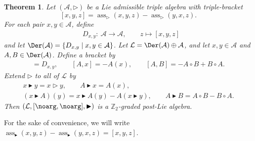 \documentclass[pdftex]{sigma}
\numberwithin{equation}{section}
\newtheorem{Theorem}{Theorem}[section]
\begin{document}
\begin{Theorem}\label{th:pL_emb}
Let $(\mathcal{A},\rhd)$ be a Lie admissible triple algebra with triple-bracket
\[
[x,y,z] = \operatorname{ass}_{\rhd}(x,y,z) -\operatorname{ass}_{\rhd}(y,x,z).
\]
For each pair $x,y \in \mathcal{A}$, define
\begin{align*}
& D_{x,y}\colon \ \mathcal{A} \longrightarrow \mathcal{A}, \qquad
 z \longmapsto [x,y,z]
\end{align*}
and let $\Der(\mathcal{A}) = \{ D_{x,y} \mid x,y \in \mathcal{A} \}$. Let $\mathcal{L}=\Der(\mathcal{A}) \oplus \mathcal{A}$, and let $x,y \in \mathcal{A}$ and $A,B \in \Der(\mathcal{A})$. Define a bracket by
\begin{gather*}
 [x,y] = D_{x,y}, \qquad
 [A,x] = -A(x), \qquad
 [A,B] = -A \circ B + B \circ A.
\end{gather*}
Extend $\rhd$ to all of $\mathcal{L}$ by
\begin{gather*}
 x \blacktriangleright y = x \rhd y, \qquad
 A \blacktriangleright x = A(x), \\
 (x \blacktriangleright A)(y) = x \blacktriangleright A(y) - A(x\blacktriangleright y), \qquad
 A \blacktriangleright B = A \circ B - B \circ A.
\end{gather*}
Then $(\mathcal{L},[\noarg,\noarg],\blacktriangleright)$ is a $\mathbb{Z}_2$-graded post-Lie algebra.
\end{Theorem}

For the sake of convenience, we will write $\operatorname{ass}_{\blacktriangleright}(x,y,z) - \operatorname{ass}_{\blacktriangleright}(y,x,z) = [x,y,z]$.
\end{document}
